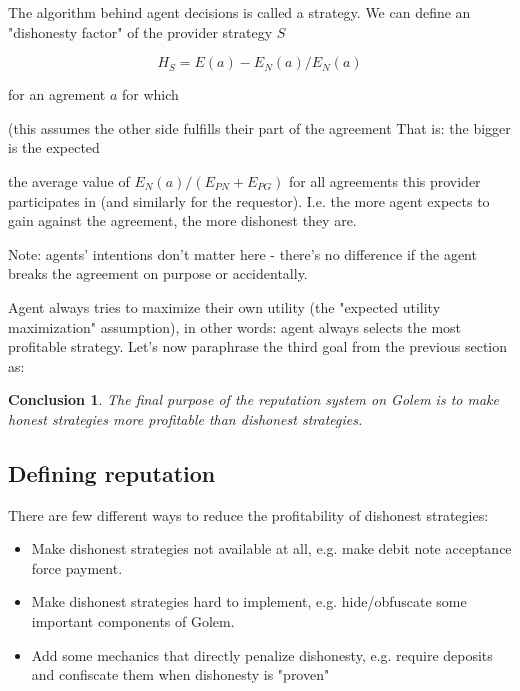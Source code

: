 \documentclass{article}
\newtheorem{conclusion}{Conclusion}[section]
\begin{document}
The algorithm behind agent decisions is called a strategy. We can define an "dishonesty factor" of the provider strategy $S$

\begin{equation}
    H_S = E(a) - E_N(a) / E_N(a)
\end{equation}

for an agrement $a$ for which 

(this assumes the other side fulfills their part of the agreement
That is: the bigger is the expected

the average value of $E_N(a)/(E_{PN} + E_{PG})$ for all agreements this provider participates in (and similarly for the requestor).
I.e. the more agent expects to gain against the agreement, the more dishonest they are.

Note: agents' intentions don't matter here - there's no difference if the agent breaks the agreement on purpose or accidentally.

Agent always tries to maximize their own utility (the "expected utility maximization" assumption), in other words: agent always selects the most profitable strategy.
Let's now paraphrase the third goal from the previous section as:

\begin{conclusion}

The final purpose of the reputation system on Golem is to make honest strategies more profitable than dishonest strategies.

\label{main purpose conclusion}
\end{conclusion}


\subsection{Defining reputation}

There are few different ways to reduce the profitability of dishonest strategies:

\begin{itemize}
\item{Make dishonest strategies not available at all, e.g. make debit note acceptance force payment.}
\item{Make dishonest strategies hard to implement, e.g. hide/obfuscate some important components of Golem.}
\item{Add some mechanics that directly penalize dishonesty, e.g. require deposits and confiscate them when dishonesty is "proven"}
\end{itemize}
\end{document}
